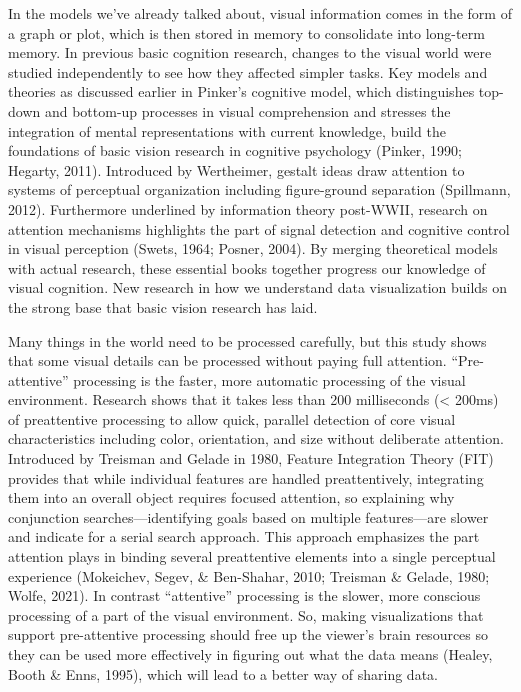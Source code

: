\documentclass[print]{nuthesis}
\begin{document}
In the models we've already talked about, visual information comes in the form of a graph or plot, which is then stored in memory to consolidate into long-term memory.
In previous basic cognition research, changes to the visual world were studied independently to see how they affected simpler tasks. Key models and theories as discussed earlier in Pinker's cognitive model, which distinguishes top-down and bottom-up processes in visual comprehension and stresses the integration of mental representations with current knowledge, build the foundations of basic vision research in cognitive psychology (Pinker, 1990; Hegarty, 2011).
Introduced by Wertheimer, gestalt ideas draw attention to systems of perceptual organization including figure-ground separation (Spillmann, 2012).
Furthermore underlined by information theory post-WWII, research on attention mechanisms highlights the part of signal detection and cognitive control in visual perception (Swets, 1964; Posner, 2004).
By merging theoretical models with actual research, these essential books together progress our knowledge of visual cognition.
New research in how we understand data visualization builds on the strong base that basic vision research has laid.

Many things in the world need to be processed carefully, but this study shows that some visual details can be processed without paying full attention. ``Pre-attentive'' processing is the faster, more automatic processing of the visual environment.
Research shows that it takes less than 200 milliseconds (\textless{} 200ms) of preattentive processing to allow quick, parallel detection of core visual characteristics including color, orientation, and size without deliberate attention.
Introduced by Treisman and Gelade in 1980, Feature Integration Theory (FIT) provides that while individual features are handled preattentively, integrating them into an overall object requires focused attention, so explaining why conjunction searches---identifying goals based on multiple features---are slower and indicate for a serial search approach.
This approach emphasizes the part attention plays in binding several preattentive elements into a single perceptual experience (Mokeichev, Segev, \& Ben-Shahar, 2010; Treisman \& Gelade, 1980; Wolfe, 2021).
In contrast ``attentive'' processing is the slower, more conscious processing of a part of the visual environment.
So, making visualizations that support pre-attentive processing should free up the viewer's brain resources so they can be used more effectively in figuring out what the data means (Healey, Booth \& Enns, 1995), which will lead to a better way of sharing data.
\end{document}
